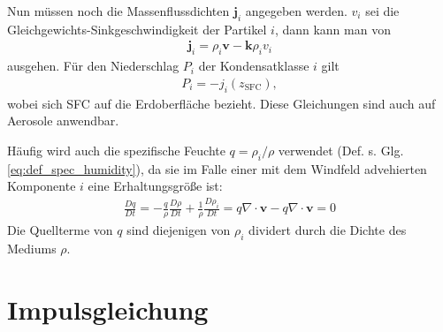 \documentclass{book}
\newcommand{\md}[1]{\frac{D#1}{Dt}}
\begin{document}
Nun müssen noch die Massenflussdichten $\mathbf{j}_i$ angegeben werden. $v_i$ sei die Gleich\-ge\-wichts-Sink\-ge\-schwin\-dig\-keit der Partikel $i$, dann kann man von
%
\begin{eqnarray}
\mathbf{j}_i = \rho_i\mathbf{v} - \mathbf{k}\rho_iv_i
\end{eqnarray}
%
ausgehen. Für den Niederschlag $P_i$ der Kondensatklasse $i$ gilt
%
\begin{eqnarray}
P_i = -j_i\left(z_{\text{SFC}}\right), 
\end{eqnarray}
%
wobei sich SFC auf die Erdoberfläche bezieht. Diese Gleichungen sind auch auf Aerosole anwendbar.

Häufig wird auch die spezifische Feuchte $q = \rho_i/\rho$ verwendet (Def. s. Glg. \eqref{eq:def_spec_humidity}), da sie im Falle einer mit dem Windfeld advehierten Komponente $i$ eine Erhaltungsgröße ist:
%
\begin{eqnarray}
\md{q} = -\frac{q}{\rho}\md{\rho} + \frac{1}{\rho}\md{\rho_i} = q\nabla\cdot\mathbf{v} - q\nabla\cdot\mathbf{v} = 0
\end{eqnarray}
%
Die Quellterme von $q$ sind diejenigen von $\rho_i$ dividert durch die Dichte des Mediums $\rho$.

\section{Impulsgleichung}
\label{sec:impulsgleichung}
\end{document}
